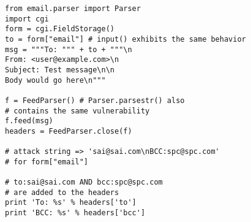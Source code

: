 \begin{lstlisting}
from email.parser import Parser
import cgi
form = cgi.FieldStorage()
to = form["email"] # input() exhibits the same behavior
msg = """To: """ + to + """\n
From: <user@example.com>\n
Subject: Test message\n\n
Body would go here\n"""

f = FeedParser() # Parser.parsestr() also 
# contains the same vulnerability
f.feed(msg)
headers = FeedParser.close(f)

# attack string => 'sai@sai.com\nBCC:spc@spc.com'
# for form["email"]

# to:sai@sai.com AND bcc:spc@spc.com 
# are added to the headers
print 'To: %s' % headers['to']
print 'BCC: %s' % headers['bcc']
\end{lstlisting}